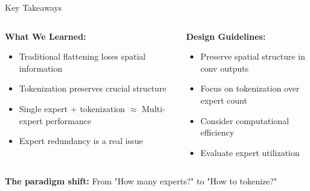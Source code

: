\documentclass{beamer}
\begin{document}
\begin{frame}{Key Takeaways}
  \begin{columns}[T]
    \begin{column}{0.5\textwidth}
      \textbf{What We Learned:}
      \begin{itemize}
        \item Traditional flattening loses spatial information
        \item Tokenization preserves crucial structure
        \item Single expert + tokenization $\approx$ Multi-expert performance
        \item Expert redundancy is a real issue
      \end{itemize}
    \end{column}
    \begin{column}{0.5\textwidth}
      \textbf{Design Guidelines:}
      \begin{itemize}
        \item Preserve spatial structure in conv outputs
        \item Focus on tokenization over expert count
        \item Consider computational efficiency
        \item Evaluate expert utilization
      \end{itemize}
    \end{column}
  \end{columns}
  
  \vspace{1em}
  \begin{center}
    \textbf{The paradigm shift:} From "How many experts?" to "How to tokenize?"
  \end{center}
\end{frame}
\end{document}
